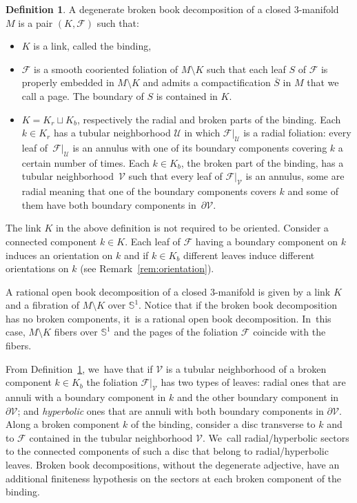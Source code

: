 \documentclass[JEP,XML,SOM,Unicode,NoEqCountersInSection,NoFloatCountersInSection,published]{cedram}
\newcommand{\threemanifold}{$3$\nobreakdash-mani\-fold\xspace}
\theoremstyle{definition}
\newtheorem{defi}[theorem]{Definition}
\newcommand{\mS}{\mathbb{S}}
\begin{document}
\begin{defi}\label{defn:BBD}
A degenerate broken book decomposition of a closed \threemanifold~$M$ is a pair $(K,\mathcal{F})$ such that:
\begin{itemize}
\item
$K$ is a link, called the binding,
\item
$\mathcal{F}$ is a smooth cooriented foliation of $M\setminus K$ such that each leaf $S$ of $\mathcal{F}$ is properly embedded in $M\setminus K$ and admits a compactification $\overline{S}$ in $M$ that we call a page. The boundary of $S$ is contained in $K$.
\item
$K=K_r\sqcup K_b$, respectively the radial and broken parts of the binding. Each $k\in K_r$ has a tubular neighborhood $\mathcal{U}$ in which $\mathcal{F}|_{\mathcal U}$ is a radial foliation: every leaf of~$\mathcal{F}|_{\mathcal U}$ is an annulus with one of its boundary components covering $k$ a certain number of times. Each $k\in K_b$, the broken part of the binding, has a tubular neighborhood~$\mathcal{V}$ such that every leaf of $\mathcal{F}|_{\mathcal{V}}$ is an annulus, some are radial meaning that one of the boundary components covers $k$ and some of them have both boundary components in~$\partial \mathcal{V}$.
\end{itemize}
\end{defi}

The link $K$ in the above definition is not required to be oriented. Consider a connected component $k\in K$. Each leaf of $\mathcal{F}$ having a boundary component on $k$ induces an orientation on $k$ and if $k\in K_b$ different leaves induce different orientations on $k$ (see Remark~\ref{rem:orientation}).

A rational open book decomposition of a closed \threemanifold is given by a link $K$ and a fibration of $M\setminus K$ over $\mathbb{S}^1$. Notice that if the broken book decomposition has no broken components, it~is a rational open book decomposition. In~this case, $M\setminus K$ fibers over $\mS^1$ and the pages of the foliation $\mathcal{F}$ coincide with the fibers.

From Definition~\ref{defn:BBD}, we~have that if $\mathcal{V}$ is a tubular neighborhood of a broken component $k\in K_b$ the foliation $\mathcal{F}|_{\mathcal{V}}$ has two types of leaves: radial ones that are annuli with a boundary component in $k$ and the other boundary component in $\partial {\mathcal{V}}$; and \emph{hyperbolic} ones that are annuli with both boundary components in $\partial {\mathcal{V}}$.
Along a broken component $k$ of the binding, consider a disc transverse to $k$ and to $\mathcal{F}$ contained in the tubular neighborhood $\mathcal V$. We~call radial/hyperbolic sectors to the connected components of such a disc that belong to radial/hyperbolic leaves. Broken book decompositions, without the degenerate adjective, have an additional finiteness hypothesis on the sectors at each broken component of the binding.
\end{document}

